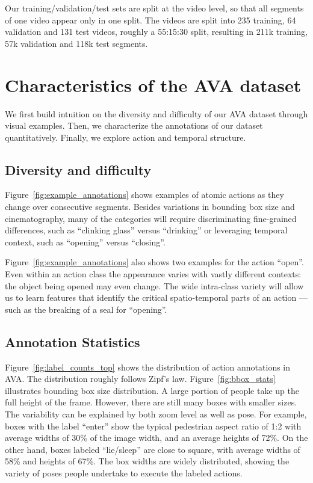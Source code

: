 \documentclass[10pt,twocolumn,letterpaper]{article}
\begin{document}
Our training/validation/test sets are split at the video level, so that all segments of one video appear only in one split. The \numMovies{} videos are split into 235 training, 64 validation and 131 test videos, roughly a 55:15:30 split, resulting in 211k training, 57k validation and 118k test segments. 
\section{Characteristics of the AVA dataset}
\label{sec:stats}

We first build intuition on the diversity and difficulty of our AVA dataset through visual examples. Then, we characterize the annotations of our dataset quantitatively. Finally, we explore action and temporal structure.

\subsection{Diversity and difficulty}

Figure~\ref{fig:example_annotations} shows examples of atomic actions as they change over consecutive segments. Besides variations in bounding box size and cinematography, many of the categories will require discriminating fine-grained differences, such as ``clinking glass'' versus ``drinking'' or leveraging temporal context, such as ``opening'' versus ``closing''. 

Figure~\ref{fig:example_annotations} also shows two examples for the action ``open''. Even within an action class the appearance varies with vastly different contexts: the object being opened may even change.  The wide intra-class variety will allow us to learn features that identify the critical spatio-temporal parts of an action --- such as the breaking of a seal for ``opening''.

\subsection{Annotation Statistics}

Figure~\ref{fig:label_counts_top} shows the distribution of action annotations in AVA. The distribution roughly follows Zipf's law. Figure~\ref{fig:bbox_stats} illustrates bounding box size distribution. A large portion of people take up the full height of the frame. However, there are still many boxes with smaller sizes. The variability can be explained by both zoom level as well as pose. For example, boxes with the label ``enter'' show the typical pedestrian aspect ratio of 1:2 with average widths of 30\% of the image width, and an average heights of 72\%. On the other hand, boxes labeled ``lie/sleep'' are close to square, with average widths of 58\% and heights of 67\%. The box widths are widely distributed, showing the variety of poses people undertake to execute the labeled actions. 
\end{document}
